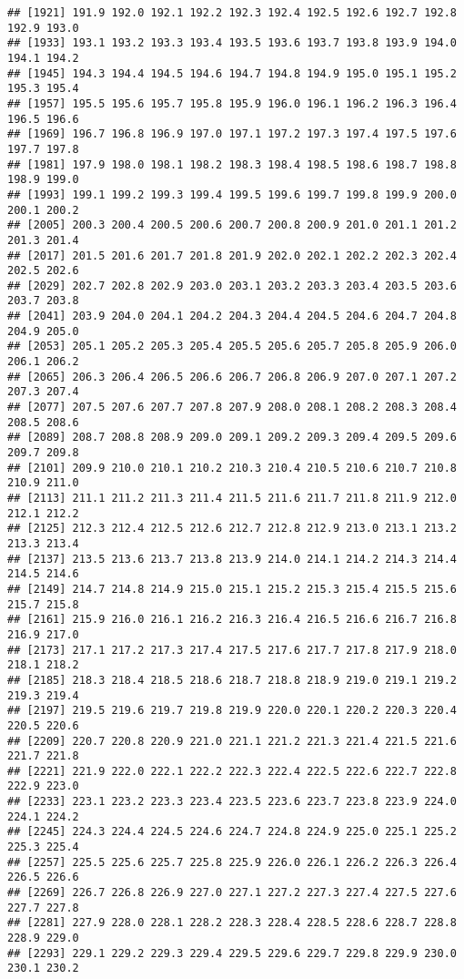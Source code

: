 \documentclass[
]{article}
\begin{document}
\begin{verbatim}
## [1921] 191.9 192.0 192.1 192.2 192.3 192.4 192.5 192.6 192.7 192.8 192.9 193.0
## [1933] 193.1 193.2 193.3 193.4 193.5 193.6 193.7 193.8 193.9 194.0 194.1 194.2
## [1945] 194.3 194.4 194.5 194.6 194.7 194.8 194.9 195.0 195.1 195.2 195.3 195.4
## [1957] 195.5 195.6 195.7 195.8 195.9 196.0 196.1 196.2 196.3 196.4 196.5 196.6
## [1969] 196.7 196.8 196.9 197.0 197.1 197.2 197.3 197.4 197.5 197.6 197.7 197.8
## [1981] 197.9 198.0 198.1 198.2 198.3 198.4 198.5 198.6 198.7 198.8 198.9 199.0
## [1993] 199.1 199.2 199.3 199.4 199.5 199.6 199.7 199.8 199.9 200.0 200.1 200.2
## [2005] 200.3 200.4 200.5 200.6 200.7 200.8 200.9 201.0 201.1 201.2 201.3 201.4
## [2017] 201.5 201.6 201.7 201.8 201.9 202.0 202.1 202.2 202.3 202.4 202.5 202.6
## [2029] 202.7 202.8 202.9 203.0 203.1 203.2 203.3 203.4 203.5 203.6 203.7 203.8
## [2041] 203.9 204.0 204.1 204.2 204.3 204.4 204.5 204.6 204.7 204.8 204.9 205.0
## [2053] 205.1 205.2 205.3 205.4 205.5 205.6 205.7 205.8 205.9 206.0 206.1 206.2
## [2065] 206.3 206.4 206.5 206.6 206.7 206.8 206.9 207.0 207.1 207.2 207.3 207.4
## [2077] 207.5 207.6 207.7 207.8 207.9 208.0 208.1 208.2 208.3 208.4 208.5 208.6
## [2089] 208.7 208.8 208.9 209.0 209.1 209.2 209.3 209.4 209.5 209.6 209.7 209.8
## [2101] 209.9 210.0 210.1 210.2 210.3 210.4 210.5 210.6 210.7 210.8 210.9 211.0
## [2113] 211.1 211.2 211.3 211.4 211.5 211.6 211.7 211.8 211.9 212.0 212.1 212.2
## [2125] 212.3 212.4 212.5 212.6 212.7 212.8 212.9 213.0 213.1 213.2 213.3 213.4
## [2137] 213.5 213.6 213.7 213.8 213.9 214.0 214.1 214.2 214.3 214.4 214.5 214.6
## [2149] 214.7 214.8 214.9 215.0 215.1 215.2 215.3 215.4 215.5 215.6 215.7 215.8
## [2161] 215.9 216.0 216.1 216.2 216.3 216.4 216.5 216.6 216.7 216.8 216.9 217.0
## [2173] 217.1 217.2 217.3 217.4 217.5 217.6 217.7 217.8 217.9 218.0 218.1 218.2
## [2185] 218.3 218.4 218.5 218.6 218.7 218.8 218.9 219.0 219.1 219.2 219.3 219.4
## [2197] 219.5 219.6 219.7 219.8 219.9 220.0 220.1 220.2 220.3 220.4 220.5 220.6
## [2209] 220.7 220.8 220.9 221.0 221.1 221.2 221.3 221.4 221.5 221.6 221.7 221.8
## [2221] 221.9 222.0 222.1 222.2 222.3 222.4 222.5 222.6 222.7 222.8 222.9 223.0
## [2233] 223.1 223.2 223.3 223.4 223.5 223.6 223.7 223.8 223.9 224.0 224.1 224.2
## [2245] 224.3 224.4 224.5 224.6 224.7 224.8 224.9 225.0 225.1 225.2 225.3 225.4
## [2257] 225.5 225.6 225.7 225.8 225.9 226.0 226.1 226.2 226.3 226.4 226.5 226.6
## [2269] 226.7 226.8 226.9 227.0 227.1 227.2 227.3 227.4 227.5 227.6 227.7 227.8
## [2281] 227.9 228.0 228.1 228.2 228.3 228.4 228.5 228.6 228.7 228.8 228.9 229.0
## [2293] 229.1 229.2 229.3 229.4 229.5 229.6 229.7 229.8 229.9 230.0 230.1 230.2

\end{verbatim}
\end{document}
